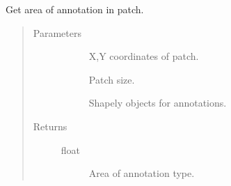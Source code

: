 \documentclass[letterpaper,10pt,english]{sphinxmanual}
\begin{document}
\begin{fulllineitems}
\label{\detokenize{index:pathflowai.utils.is_coords_in_box}}
Get area of annotation in patch.
\begin{quote}\begin{description}
\item[{Parameters}] \leavevmode\begin{description}
\item[{}] \leavevmode
X,Y coordinates of patch.

\item[{}] \leavevmode
Patch size.

\item[{}] \leavevmode
Shapely objects for annotations.

\end{description}

\item[{Returns}] \leavevmode\begin{description}
\item[{float}] \leavevmode
Area of annotation type.

\end{description}

\end{description}\end{quote}

\end{fulllineitems}

\end{document}
